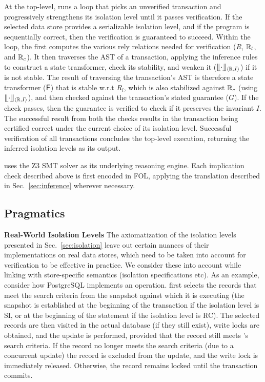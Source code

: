 At the top-level, \tool runs a loop that picks an unverified
transaction and progressively strengthens its isolation level until it
passes verification. If the selected data store provides a
serializable isolation level, and if the program is sequentially
correct, then the verification is guaranteed to succeed. Within the
loop, the \tool first computes the various rely relations needed for
verification ($R$, $\mathbb{R}_l$, and $\mathbb{R}_c$). It then traverses the AST of a
transaction, applying the inference rules to construct a state
transformer, check its stability, and weaken it ($\llfloor \cdot \rrfloor_{\langle \mathbb{R},I \rangle}$)
if it is not stable. The result of traversing the transaction's AST is
therefore a state transformer (${\sf F}$) that is stable w.r.t $R_l$, which
is also stabilized against $\mathbb{R}_c$ (using $\llfloor \cdot \rrfloor_{\langle \mathbb{R},I \rangle}$), and
then checked against the transaction's stated guarantee ($G$). If the
check passes, then the guarantee is verified to check if it preserves
the invariant $I$. The successful result from both the checks results
in the transaction being certified correct under the current choice of
its isolation level. Successful verification of all transactions
concludes the top-level execution, returning the inferred isolation
levels as its output.

\tool uses the Z3 SMT solver as its underlying reasoning engine. Each
implication check described above is first encoded in FOL, applying
the translation described in Sec.~\ref{sec:inference} wherever
necessary.

\subsection{Pragmatics}

\textbf{Real-World Isolation Levels} The axiomatization of the
isolation levels presented in Sec.~\ref{sec:isolation} leave out
certain nuances of their implementations on real data stores, which
need to be taken into account for verification to be effective in
practice.  We consider these into account while linking \tool with
store-specific semantics (isolation specifications etc). As an
example, consider how PostgreSQL implements an  operation.
 first selects the records that meet the search criteria
from the snapshot against which it is executing (the snapshot is
established at the beginning of the transaction if the isolation level
is SI, or at the beginning of the  statement if the
isolation level is RC). The selected records are then visited in the
actual database (if they still exist), write locks are obtained, and
the update is performed, provided that the record still meets
's search criteria. If the record no longer meets the
search criteria (due to a concurrent update) the record is excluded
from the update, and the write lock is immediately released.
Otherwise, the record remains locked until the transaction commits. 

